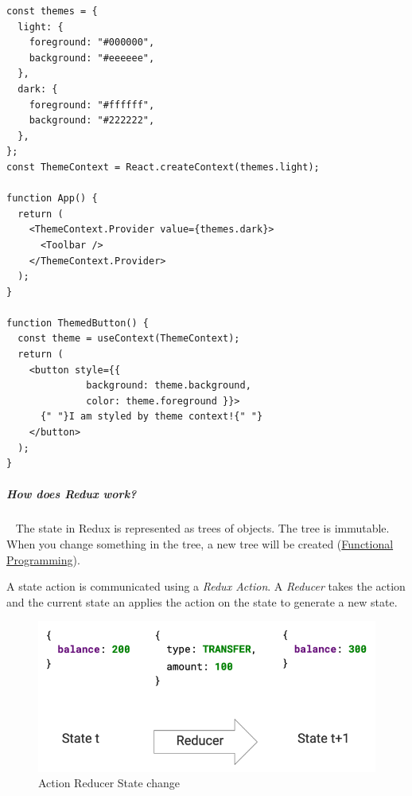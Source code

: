 \documentclass[11pt,twoside,landscape]{article}
\begin{document}
\begin{multicols}{3}
\begin{verbatim}
const themes = {
  light: {
    foreground: "#000000",
    background: "#eeeeee",
  },
  dark: {
    foreground: "#ffffff",
    background: "#222222",
  },
};
const ThemeContext = React.createContext(themes.light);

function App() {
  return (
    <ThemeContext.Provider value={themes.dark}>
      <Toolbar />
    </ThemeContext.Provider>
  );
}

function ThemedButton() {
  const theme = useContext(ThemeContext);
  return (
    <button style={{
              background: theme.background,
              color: theme.foreground }}>
      {" "}I am styled by theme context!{" "}
    </button>
  );
}
\end{verbatim}
\subparagraph{How does Redux work?} \
\label{sec:org90b38db}
The state in Redux is represented as trees of objects.
The tree is immutable.
When you change something in the tree, a new tree will be created (\href{../../../roam/20220616080932-functional_programming.org}{Functional Programming}).

A state action is communicated using a \emph{Redux Action}.
A \emph{Reducer} takes the action and the current state an applies the action on the state to generate a new state.

\begin{figure}[htbp]
\centering
\includegraphics[width=.9\linewidth]{img/redux_action_reducer.png}
\caption{\label{fig:action-reducer-state-change}Action Reducer State change}
\end{figure}

\end{multicols}
\end{document}

